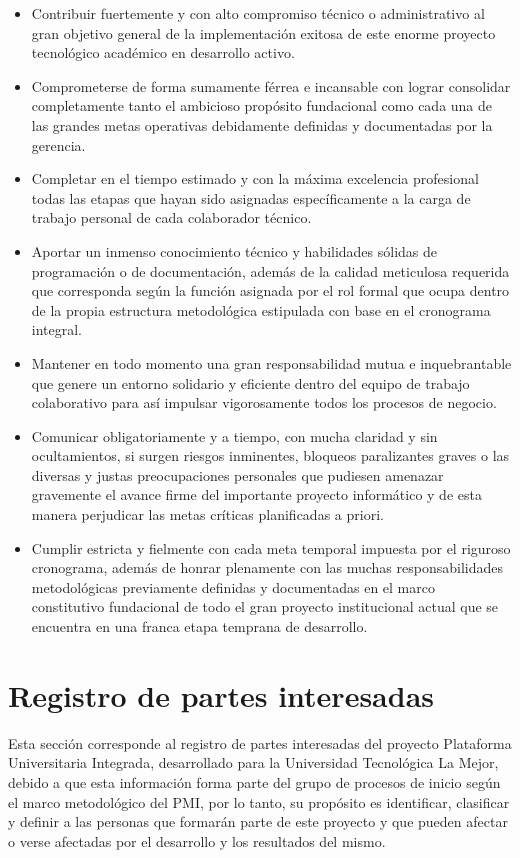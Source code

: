 \documentclass[11pt,spanish]{article}
\begin{document}
\begin{itemize}
    \item Contribuir fuertemente y con alto compromiso técnico o administrativo al gran objetivo general de la implementación exitosa de este enorme proyecto tecnológico académico en desarrollo activo.
    \item Comprometerse de forma sumamente férrea e incansable con lograr consolidar completamente tanto el ambicioso propósito fundacional como cada una de las grandes metas operativas debidamente definidas y documentadas por la gerencia.
    \item Completar en el tiempo estimado y con la máxima excelencia profesional todas las etapas que hayan sido asignadas específicamente a la carga de trabajo personal de cada colaborador técnico.
    \item Aportar un inmenso conocimiento técnico y habilidades sólidas de programación o de documentación, además de la calidad meticulosa requerida que corresponda según la función asignada por el rol formal que ocupa dentro de la propia estructura metodológica estipulada con base en el cronograma integral.
    \item Mantener en todo momento una gran responsabilidad mutua e inquebrantable que genere un entorno solidario y eficiente dentro del equipo de trabajo colaborativo para así impulsar vigorosamente todos los procesos de negocio.
    \item Comunicar obligatoriamente y a tiempo, con mucha claridad y sin ocultamientos, si surgen riesgos inminentes, bloqueos paralizantes graves o las diversas y justas preocupaciones personales que pudiesen amenazar gravemente el avance firme del importante proyecto informático y de esta manera perjudicar las metas críticas planificadas a priori.
    \item Cumplir estricta y fielmente con cada meta temporal impuesta por el riguroso cronograma, además de honrar plenamente con las muchas responsabilidades metodológicas previamente definidas y documentadas en el marco constitutivo fundacional de todo el gran proyecto institucional actual que se encuentra en una franca etapa temprana de desarrollo.
\end{itemize}

\newpage
\section{Registro de partes interesadas}

Esta sección corresponde al registro de partes interesadas del proyecto Plataforma Universitaria Integrada, desarrollado para la Universidad Tecnológica La Mejor, debido a que esta información forma parte del grupo de procesos de inicio según el marco metodológico del PMI, por lo tanto, su propósito es identificar, clasificar y definir a las personas que formarán parte de este proyecto y que pueden afectar o verse afectadas por el desarrollo y los resultados del mismo.
\end{document}
